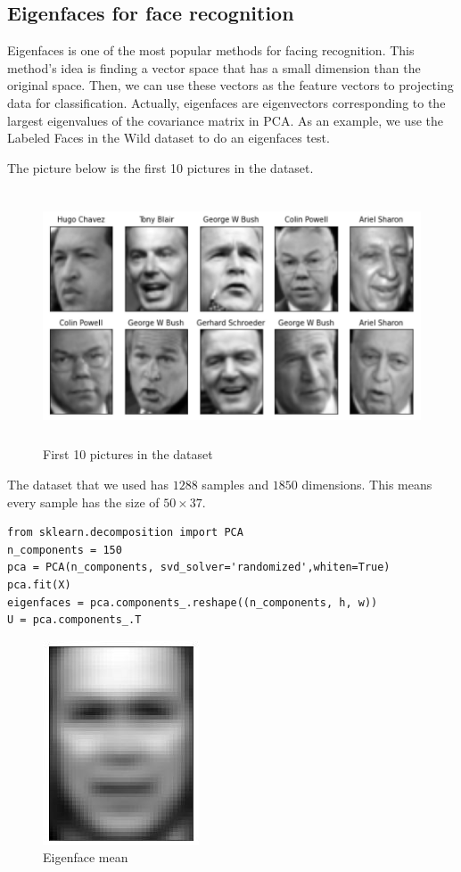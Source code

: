 \documentclass[a4paper, 12pt]{report}
\begin{document}
\subsection{Eigenfaces for face recognition}
\indent \par Eigenfaces is one of the most popular methods for facing recognition. This method's idea is finding a vector space that has a small dimension than the original space. Then, we can use these vectors as the feature vectors to projecting data for classification. Actually, eigenfaces are eigenvectors corresponding to the largest eigenvalues of the covariance matrix in PCA. As an example, we use the Labeled Faces in the Wild dataset to do an eigenfaces test.

The picture below is the first 10 pictures in the dataset.
\begin{figure}[H]
    \center
    \includegraphics[width=15cm,height=7.5cm]{face_demo.png}
    \caption{First 10 pictures in the dataset}
\end{figure}
The dataset that we used has $1288$ samples and $1850$ dimensions. This means every sample has the size of $50 \times 37$.
\begin{verbatim}
from sklearn.decomposition import PCA
n_components = 150
pca = PCA(n_components, svd_solver='randomized',whiten=True)
pca.fit(X)
eigenfaces = pca.components_.reshape((n_components, h, w))
U = pca.components_.T
\end{verbatim}
\begin{figure}[H]
    \center
    \includegraphics{meanface.jpg}
    \caption{Eigenface mean}
\end{figure}
\end{document}
